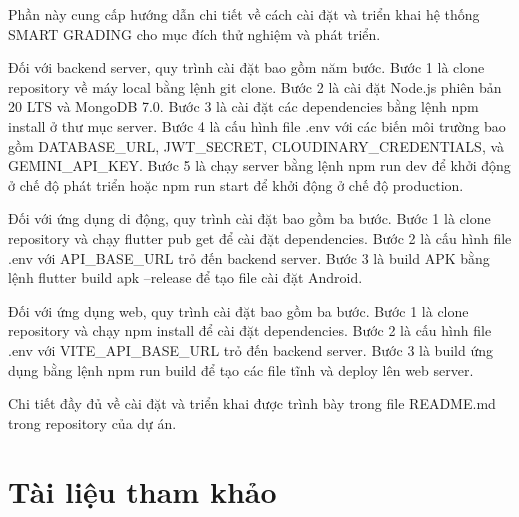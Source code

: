 \documentclass[../DoAn.tex]{subfiles}
\begin{document}
Phần này cung cấp hướng dẫn chi tiết về cách cài đặt và triển khai hệ thống SMART GRADING cho mục đích thử nghiệm và phát triển.

Đối với backend server, quy trình cài đặt bao gồm năm bước. Bước 1 là clone repository về máy local bằng lệnh git clone. Bước 2 là cài đặt Node.js phiên bản 20 LTS và MongoDB 7.0. Bước 3 là cài đặt các dependencies bằng lệnh npm install ở thư mục server. Bước 4 là cấu hình file .env với các biến môi trường bao gồm DATABASE_URL, JWT_SECRET, CLOUDINARY_CREDENTIALS, và GEMINI_API_KEY. Bước 5 là chạy server bằng lệnh npm run dev để khởi động ở chế độ phát triển hoặc npm run start để khởi động ở chế độ production.

Đối với ứng dụng di động, quy trình cài đặt bao gồm ba bước. Bước 1 là clone repository và chạy flutter pub get để cài đặt dependencies. Bước 2 là cấu hình file .env với API_BASE_URL trỏ đến backend server. Bước 3 là build APK bằng lệnh flutter build apk --release để tạo file cài đặt Android.

Đối với ứng dụng web, quy trình cài đặt bao gồm ba bước. Bước 1 là clone repository và chạy npm install để cài đặt dependencies. Bước 2 là cấu hình file .env với VITE_API_BASE_URL trỏ đến backend server. Bước 3 là build ứng dụng bằng lệnh npm run build để tạo các file tĩnh và deploy lên web server.

Chi tiết đầy đủ về cài đặt và triển khai được trình bày trong file README.md trong repository của dự án.

\section{Tài liệu tham khảo}
\label{section:7.3}

\nocite{*}


\end{document}
